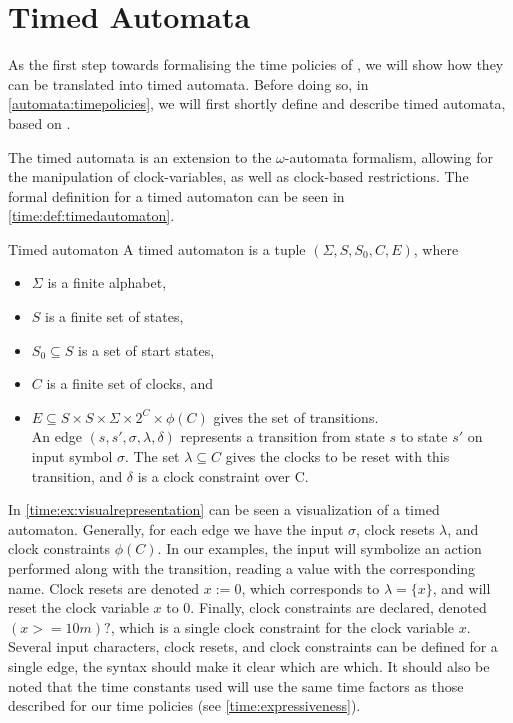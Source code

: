 
\section{Timed Automata}\label{automata}
As the first step towards formalising the time policies of \thelang, we will show how they can be translated into timed automata.
Before doing so, in \cref{automata:timepolicies}, we will first shortly define and describe timed automata, based on \cite{alur1994theory}.

The timed automata is an extension to the $\omega$-automata formalism, allowing for the manipulation of clock-variables, as well as clock-based restrictions.
The formal definition for a timed automaton can be seen in \cref{time:def:timedautomaton}.

\begin{definition}{Timed automaton}\label{time:def:timedautomaton}
A timed automaton is a tuple $(\Sigma, S, S_0, C, E)$, where
\begin{itemize}
  \item $\Sigma$ is a finite alphabet,
  \item $S$ is a finite set of states,
  \item $S_0 \subseteq S$ is a set of start states,
  \item $C$ is a finite set of clocks, and
  \item $E \subseteq S \times S \times \Sigma \times 2^C \times \phi(C)$ gives the set of transitions. \\
    An edge $(s, s', \sigma, \lambda, \delta)$ represents a transition from state $s$ to state $s'$ on input symbol $\sigma$.
    The set $\lambda \subseteq C$ gives the clocks to be reset with this transition, and $\delta$ is a clock constraint over C.
\end{itemize}
\end{definition}

In \cref{time:ex:visualrepresentation} can be seen a visualization of a timed automaton.
Generally, for each edge we have the input $\sigma$, clock resets $\lambda$, and clock constraints $\phi(C)$.
In our examples, the input will symbolize an action performed along with the transition, reading a value with the corresponding name.
Clock resets are denoted $x := 0$, which corresponds to $\lambda = \{ x \}$, and will reset the clock variable $x$ to 0.
Finally, clock constraints are declared, denoted $(x >= 10m)?$, which is a single clock constraint for the clock variable $x$.
Several input characters, clock resets, and clock constraints can be defined for a single edge, the syntax should make it clear which are which.
It should also be noted that the time constants used will use the same time factors as those described for our time policies (see \cref{time:expressiveness}).

